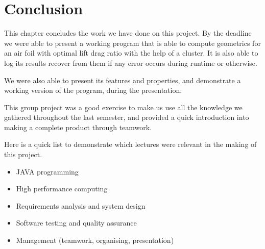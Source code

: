 \documentclass[10pt,a4paper]{report}
\begin{document}
\chapter{Conclusion}
\label{ch:conc}
This chapter concludes the work we have done on this project. By the deadline we were able to present a working program that is able to compute geometrics for an air foil with optimal lift drag ratio with the help of a cluster. It is also able to log its results recover from them if any error occurs during runtime or otherwise. 

We were also able to present its features and properties, and demonstrate a working version of the program, during the presentation. 

This group project was a good exercise to make us use all the knowledge we gathered throughout the last semester, and provided a quick introduction into making a complete product through teamwork.

Here is a quick list to demonstrate which lectures were relevant in the making of this project.
\begin{itemize}
	\item JAVA programming
	\item High performance computing
	\item Requirements analysis and system design
	\item Software testing and quality assurance
	\item Management (teamwork, organising, presentation)
\end{itemize}

\begin{flushleft}
	
	
\end{flushleft}
\end{document}
